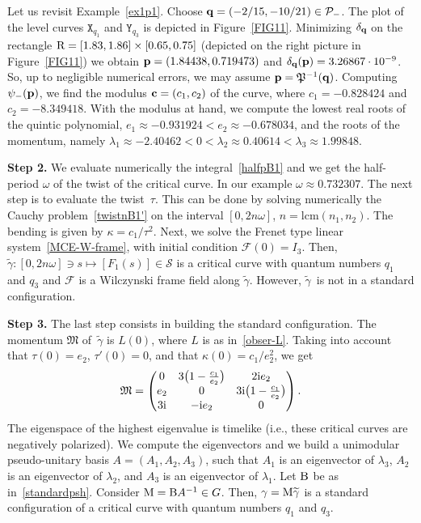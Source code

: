 \documentclass[pdftex]{sigma}
\numberwithin{equation}{section}
\def\S{\mathcal{S}}
\def\S{\mathcal{S}}
\begin{document}
\begin{Example}\label{eex1}
Let us revisit Example~\ref{ex1p1}.
Choose ${\bf q}=(-2/15,-10/21)\in {\mathcal P}_-$. The plot of the level curves ${\mathtt X}_{q_1}$ and ${\mathtt Y}_{q_3}$
is depicted in Figure~\ref{FIG11}. Minimizing $\delta_{{\bf q}}$ on the rectangle ${\rm R}=[1.83,1.86]\times [0.65,0.75]$
(depicted on the right picture in Figure~\ref{FIG11}) we obtain ${\bf p} = (1.84438,0.719473)$
and $\delta_{{\bf q}}({\bf p})=3.26867\cdot 10^{-9}$.
So, up to negligible numerical errors, we may assume
${\bf p}={\mathfrak P}^{-1}({\bf q})$. Computing $\psi_-({\bf p})$, we find the modulus ${\bf c}=(c_1,c_2)$
of the curve, where $c_1=-0.828424$ and $c_2= -8.349418$. With the modulus at hand, we compute
 the lowest real roots of the quintic polynomial, $e_1\approx -0.931924<e_2\approx -0.678034$, and the
 roots of the momentum, namely
 $\lambda_1\approx -2.40462<0<\lambda_2\approx 0.40614<\lambda_3\approx 1.99848$.
 \end{Example}

{\bf Step 2.}
We evaluate numerically the integral~\eqref{halfpB1} and we get the half-period $\omega$ of the twist of the critical curve.
In our example $\omega \approx 0.732307$. The next step is to evaluate the twist~$\tau$.
This can be done by solving numerically the Cauchy problem~\eqref{twistnB1'} on the interval $[0,2n\omega]$,
$n=\mathrm{lcm}(n_1,n_2)$.
The bending is given by $\kappa=c_1/\tau^2$. Next, we solve the Frenet type linear system~\eqref{MCE-W-frame},
with initial condition ${\mathcal F}(0)=I_3$. Then, $\widetilde{\gamma}\colon [0,2n\omega]\ni s\longmapsto [F_1(s)]\in \S$ is a critical
curve with quantum numbers $q_1$ and $q_3$ and ${\mathcal F}$ is a
Wilczynski frame
field along
{$\widetilde{\gamma}$}. However, {$\widetilde{\gamma}$}~is not in a standard configuration.

{\bf Step 3.}
The last step consists in building the standard configuration. The momentum ${\mathfrak M}$
of~$\widetilde{\gamma}$ is $L(0)$, where $L$ is as in~\eqref{obser-L}. Taking into account that $\tau(0)=e_2$,
$\tau'(0)=0$, and that $\kappa(0)=c_1/e_2^2$,
we get
\[
{\mathfrak M}=\begin{pmatrix}
 0 & 3\big(1 - \frac{c_1}{e_2}\big) & 2 {\rm i} e_2\\
 e_2 & 0 & 3{\rm i}\big(1 - \frac{c_1}{e_2}\big)\\
 3{\rm i} & -{\rm i} e_2& 0\\
 \end{pmatrix}.
\]
The eigenspace of the highest eigenvalue is timelike (i.e., these critical curves are
{negatively}
polarized).
We compute the eigenvectors and we build a unimodular pseudo-unitary basis ${A}=({A}_1,{A}_2, {A}_3)$,
 such that ${A}_1$ is an eigenvector of $\lambda_3$, ${A}_2$ is an eigenvector of $\lambda_2$, and ${A}_3$
 is an eigenvector of $\lambda_1$.
Let ${\rm B}$ be as in~\eqref{standardpsh}. Consider ${\rm M}={\rm B}{A}^{-1}\in {G}$.
Then, {$\gamma={\rm M}\widetilde{\gamma}$} is a standard configuration of a critical curve
with quantum numbers $q_1$ and $q_3$.
\end{document}
